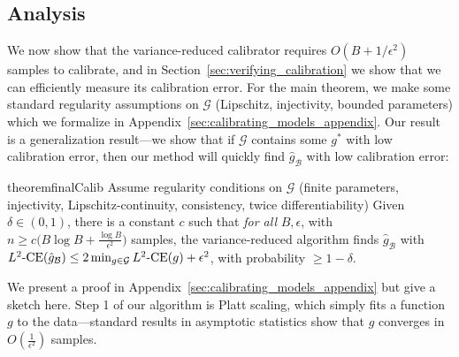 

\subsection{Analysis}

We now show that the variance-reduced calibrator requires $O(B + 1/\epsilon^2)$ samples to calibrate, and in Section~\ref{sec:verifying_calibration} we show that we can efficiently measure its calibration error. For the main theorem, we make some standard regularity assumptions on $\mathcal{G}$ (Lipschitz, injectivity, bounded parameters) which we formalize in Appendix~\ref{sec:calibrating_models_appendix}. Our result is a generalization result---we show that if $\mathcal{G}$ contains some $g^*$ with low calibration error, then our method will quickly find $\hat{g}_{\mathcal{B}}$ with low calibration error:

\begin{restatable}{theorem}{finalCalib}
\label{thm:final-calib}
Assume regularity conditions on $\mathcal{G}$ (finite parameters, injectivity, Lipschitz-continuity, consistency, twice differentiability) Given $\delta \in (0, 1)$, there is a constant $c$ such that \emph{for all} $B, \epsilon$, with $n \geq c \Big(B\log{B} + \frac{\log{B}}{\epsilon^2}\Big)$ samples, the variance-reduced algorithm finds $\hat{g}_{\mathcal{B}}$ with $L^2\mbox{-CE}(\hat{g}_{\mathcal{B}}) \leq 2\min_{g \in \mathcal{G}}L^2\mbox{-CE}(g) + \epsilon^2$, with probability $\geq 1 - \delta$.
\end{restatable}

We present a proof in Appendix~\ref{sec:calibrating_models_appendix} but give a sketch here. Step 1 of our algorithm is Platt scaling, which simply fits a function $g$ to the data---standard results in asymptotic statistics show that $g$ converges in $O(\frac{1}{\epsilon^2})$ samples.

